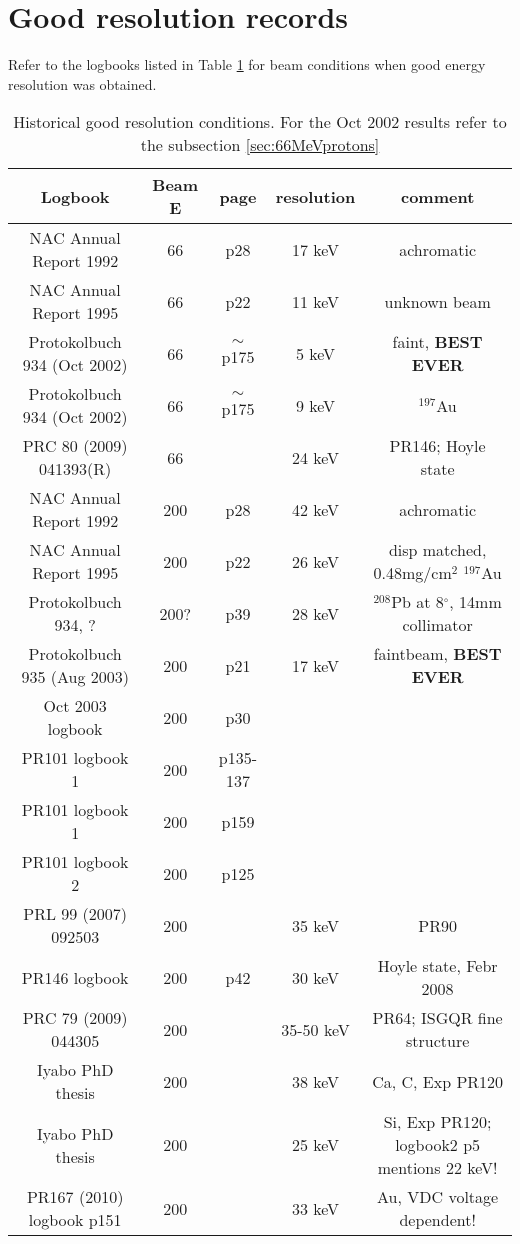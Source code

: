 \documentclass[11pt]{report}
\begin{document}
\section{Good resolution records}

Refer to the logbooks listed in Table \ref{table:goodresolution} for
beam conditions when good energy resolution was obtained.


\begin{landscape}

\begin{table}[!ht]
\centering
\begin{tabular}{|c|c|c|c|c|}
\hline
Logbook & Beam E & page & resolution & comment\\ 
\hline
\hline
NAC Annual Report 1992     & 66  & p28 & 17 keV & achromatic\\
NAC Annual Report 1995     & 66  & p22 & 11 keV & unknown beam \\
Protokolbuch 934 (Oct 2002)& 66  & $\sim$p175 & 5 keV & faint, {\bf BEST EVER}\\
Protokolbuch 934 (Oct 2002)& 66  & $\sim$p175 & 9 keV & $^{197}$Au \\
PRC 80 (2009) 041393(R)    & 66  &      & 24 keV & PR146; Hoyle state \\
\hline
NAC Annual Report 1992     & 200 & p28  & 42 keV & achromatic \\
NAC Annual Report 1995     & 200 & p22  & 26 keV & disp matched, 0.48mg/cm$^2$ $^{197}$Au\\
Protokolbuch 934, ?        & 200?& p39  & 28 keV & $^{208}$Pb at 8$^{\circ}$, 14mm collimator\\
Protokolbuch 935 (Aug 2003)& 200 & p21  & 17 keV & faintbeam, {\bf BEST EVER}\\
Oct 2003 logbook           & 200 & p30  &        & \\
PR101 logbook 1            & 200 & p135-137 &    & \\
PR101 logbook 1            & 200 & p159 &        & \\
PR101 logbook 2            & 200 & p125 &        & \\
PRL 99 (2007)  092503      & 200 &      & 35 keV & PR90 \\
PR146 logbook              & 200 & p42  & 30 keV & Hoyle state, Febr 2008 \\ 
PRC 79 (2009) 044305       & 200 &      & 35-50 keV & PR64; ISGQR fine structure \\
Iyabo PhD thesis           & 200 &      & 38 keV & Ca, C, Exp PR120 \\
Iyabo PhD thesis           & 200 &      & 25 keV & Si, Exp PR120; logbook2 p5 mentions 22 keV!\\
PR167 (2010) logbook p151  & 200 &      & 33 keV & Au, VDC voltage dependent! \\

\hline
\end{tabular}
\caption{Historical good resolution conditions. For the Oct 2002 results refer 
to the subsection \ref{sec:66MeVprotons}}
\label{table:goodresolution}
\end{table}

\end{landscape}
\end{document}
